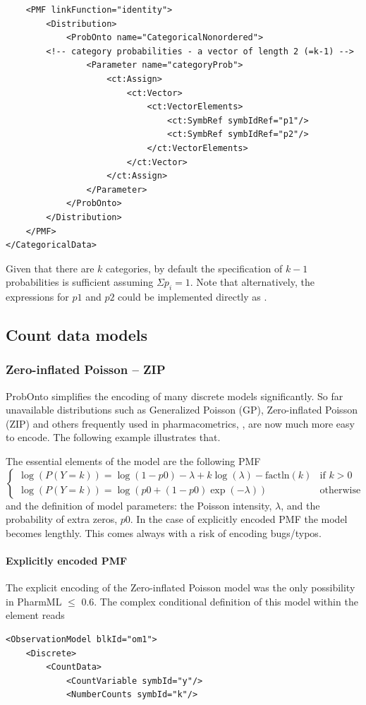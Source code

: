 {\lstset{language=XML}
\begin{lstlisting}
    <PMF linkFunction="identity">
        <Distribution>
            <ProbOnto name="CategoricalNonordered">
		<!-- category probabilities - a vector of length 2 (=k-1) -->
                <Parameter name="categoryProb">
                    <ct:Assign>
                        <ct:Vector>
                            <ct:VectorElements>
                                <ct:SymbRef symbIdRef="p1"/>
                                <ct:SymbRef symbIdRef="p2"/>
                            </ct:VectorElements>
                        </ct:Vector>
                    </ct:Assign>
                </Parameter>
            </ProbOnto>
        </Distribution>
    </PMF>
</CategoricalData>
\end{lstlisting}
Given that there are $k$ categories, by default the specification of $k-1$ probabilities 
is sufficient assuming $\Sigma p_i = 1$. Note that alternatively, the expressions for 
$p1$ and $p2$ could be implemented directly as .

\subsection{Count data models}

\subsubsection{Zero-inflated Poisson -- ZIP}
ProbOnto simplifies the encoding of many discrete models significantly. 
So far unavailable distributions such as Generalized Poisson (GP), 
Zero-inflated Poisson (ZIP) and others frequently used in pharmacometrics,
\cite{Plan:2009fk, Troconiz:2009fv}, are now much more easy to encode. The following example illustrates that.

The essential elements of the model are the following PMF
\[
\begin{cases}
  \log(P(Y=k)) = \log(1-p0) - \lambda + k\log(\lambda) - \text{factln}(k) 	& \text{if } k > 0 \\
  \log(P(Y=k)) = \log(p0 + (1-p0)\exp(-\lambda)) 					& \text{otherwise}
\end{cases}
\]
and the definition of model parameters:	 the Poisson intensity, $\lambda$,
and the probability of extra zeros, $p0$. In the case of explicitly encoded PMF
the model becomes lengthly. This comes always with a risk of encoding bugs/typos.  

\paragraph{Explicitly encoded PMF}
The explicit encoding of the Zero-inflated Poisson model was the only 
possibility in PharmML $\leq$ 0.6. The complex conditional definition of this model within the  
element reads
\lstset{language=XML}
\begin{lstlisting}
<ObservationModel blkId="om1">
    <Discrete>
        <CountData>
            <CountVariable symbId="y"/>
            <NumberCounts symbId="k"/>
            

\end{lstlisting}}
